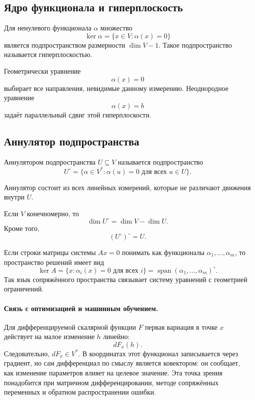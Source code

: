 \subsection{Ядро функционала и гиперплоскость}

Для ненулевого функционала \(\alpha\) множество
\[
\ker\alpha=\{x\in V:\alpha(x)=0\}
\]
является подпространством размерности \(\dim V-1\). Такое подпространство называется гиперплоскостью.

Геометрически уравнение
\[
\alpha(x)=0
\]
выбирает все направления, невидимые данному измерению. Неоднородное уравнение
\[
\alpha(x)=b
\]
задаёт параллельный сдвиг этой гиперплоскости.

\subsection{Аннулятор подпространства}

\begin{definition}
Аннулятором подпространства \(U\subseteq V\) называется подпространство
\[
U^\circ=
\{\alpha\in V^*:\alpha(u)=0\text{ для всех }u\in U\}.
\]
\end{definition}

Аннулятор состоит из всех линейных измерений, которые не различают движения внутри \(U\).

\begin{theorem}
Если \(V\) конечномерно, то
\[
\dim U^\circ=\dim V-\dim U.
\]
Кроме того,
\[
(U^\circ)^\circ=U.
\]
\end{theorem}

Если строки матрицы системы \(Ax=0\) понимать как функционалы \(\alpha_1,\dots,\alpha_m\), то пространство решений имеет вид
\[
\ker A
=
\{x:\alpha_i(x)=0\text{ для всех }i\}
=
\operatorname{span}(\alpha_1,\dots,\alpha_m)^\circ.
\]
Так язык сопряжённого пространства связывает систему уравнений с геометрией ограничений.

\paragraph{Связь с оптимизацией и машинным обучением.}

Для дифференцируемой скалярной функции \(F\) первая вариация в точке \(x\) действует на малое изменение \(h\) линейно:
\[
dF_x(h).
\]
Следовательно, \(dF_x\in V^*\). В координатах этот функционал записывается через градиент, но сам дифференциал по смыслу является ковектором: он сообщает, как изменение параметров влияет на целевое значение. Эта точка зрения понадобится при матричном дифференцировании, методе сопряжённых переменных и обратном распространении ошибки.

